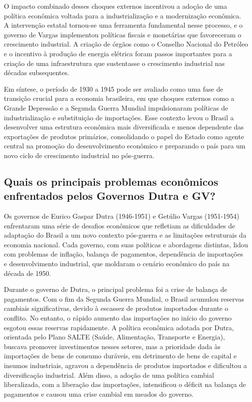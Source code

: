 \documentclass[a4paper,12pt]{article}[abntex2]
\begin{document}
O impacto combinado desses choques externos incentivou a adoção de uma política econômica voltada para a industrialização e a modernização econômica. A intervenção estatal tornou-se uma ferramenta fundamental nesse processo, e o governo de Vargas implementou políticas fiscais e monetárias que favoreceram o crescimento industrial. A criação de órgãos como o Conselho Nacional do Petróleo e o incentivo à produção de energia elétrica foram passos importantes para a criação de uma infraestrutura que sustentasse o crescimento industrial nas décadas subsequentes.

Em síntese, o período de 1930 a 1945 pode ser avaliado como uma fase de transição crucial para a economia brasileira, em que choques externos como a Grande Depressão e a Segunda Guerra Mundial impulsionaram políticas de industrialização e substituição de importações. Esse contexto levou o Brasil a desenvolver uma estrutura econômica mais diversificada e menos dependente das exportações de produtos primários, consolidando o papel do Estado como agente central na promoção do desenvolvimento econômico e preparando o país para um novo ciclo de crescimento industrial no pós-guerra.

\subsection{\textbf{Quais os principais problemas econômicos enfrentados pelos Governos Dutra e GV?}}

Os governos de Eurico Gaspar Dutra (1946-1951) e Getúlio Vargas (1951-1954) enfrentaram uma série de desafios econômicos que refletiam as dificuldades de adaptação do Brasil a um novo contexto pós-guerra e as limitações estruturais da economia nacional. Cada governo, com suas políticas e abordagens distintas, lidou com problemas de inflação, balança de pagamentos, dependência de importações e desenvolvimento industrial, que moldaram o cenário econômico do país na década de 1950.

Durante o governo de Dutra, o principal problema foi a crise de balança de pagamentos. Com o fim da Segunda Guerra Mundial, o Brasil acumulou reservas cambiais significativas, devido à escassez de produtos importados durante o conflito. No entanto, o rápido aumento das importações no início do governo esgotou essas reservas rapidamente. A política econômica adotada por Dutra, orientada pelo Plano SALTE (Saúde, Alimentação, Transporte e Energia), buscava promover investimentos nesses setores, mas a prioridade dada às importações de bens de consumo duráveis, em detrimento de bens de capital e insumos industriais, agravou a dependência de produtos importados e dificultou a diversificação industrial. Além disso, a adoção de uma política cambial liberalizada, com a liberação das importações, intensificou o déficit na balança de pagamentos e causou uma crise cambial em meados do governo.
\end{document}
